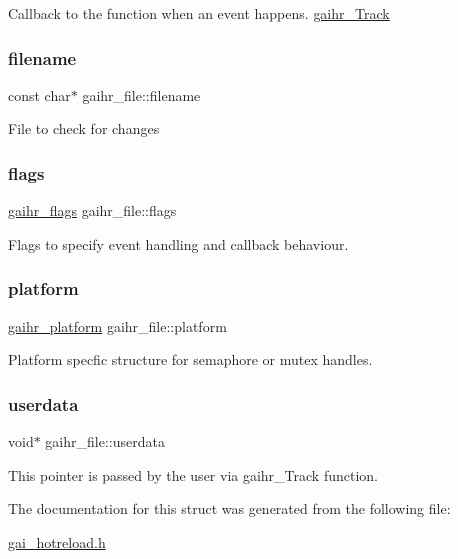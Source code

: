 Callback to the function when an event happens. \hyperlink{gai__hotreload_8h_ad83d8f6170f0404fb72803d012ac9f6a}{gaihr\+\_\+\+Track} \mbox{\label{structgaihr__file_a26ea2bbf62231c3cae2317ca217f8166}} 
\subsubsection{\texorpdfstring{filename}{filename}}
{\footnotesize\ttfamily const char$\ast$ gaihr\+\_\+file\+::filename}

File to check for changes \mbox{\label{structgaihr__file_ab6eef82d50a8a51d161de3ab7ad98ee9}} 
\subsubsection{\texorpdfstring{flags}{flags}}
{\footnotesize\ttfamily \hyperlink{gai__hotreload_8h_aaebb069b6896f065efd75640e0e4150b}{gaihr\+\_\+flags} gaihr\+\_\+file\+::flags}

Flags to specify event handling and callback behaviour. \mbox{\label{structgaihr__file_a138044c270d5f0e83917ae2841efe8b7}} 
\subsubsection{\texorpdfstring{platform}{platform}}
{\footnotesize\ttfamily \hyperlink{structgaihr__platform}{gaihr\+\_\+platform} gaihr\+\_\+file\+::platform}

Platform specfic structure for semaphore or mutex handles. \mbox{\label{structgaihr__file_a06bf963cb9c08e69fcc6c4bb3140a2b8}} 
\subsubsection{\texorpdfstring{userdata}{userdata}}
{\footnotesize\ttfamily void$\ast$ gaihr\+\_\+file\+::userdata}

This pointer is passed by the user via gaihr\+\_\+\+Track function. 

The documentation for this struct was generated from the following file\+:\begin{DoxyCompactItemize}
\item 
\hyperlink{gai__hotreload_8h}{gai\+\_\+hotreload.\+h}\end{DoxyCompactItemize}
